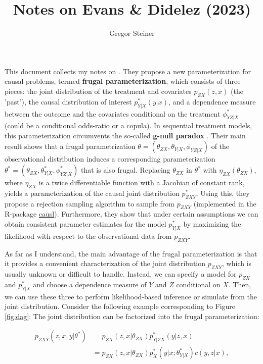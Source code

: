\documentclass[10pt]{article}
\author{Gregor Steiner}
\title{Notes on Evans \& Didelez (2023)}
\begin{document}
\maketitle

This document collects my notes on \cite{evans_didelez_2023}. They propose a new parameterization for causal problems, termed \textbf{frugal parameterization}, which consists of three pieces: the joint distribution of the treatment and covariates $p_{ZX}(z, x)$ (the 'past'), the causal distribution of interest $p_{Y | X}^* (y|x)$, and a dependence measure between the outcome and the covariates conditional on the treatment $\phi_{YZ | X}^*$ (could be a conditional odds-ratio or a copula). In sequential treatment models, this parameterization circumvents the so-called \textbf{g-null paradox} \citep{robins_wasserman_1997}. Their main result shows that a frugal parametrization $\theta = (\theta_{ZX}, \theta_{Y|X}, \phi_{YZ | X})$ of the observational distribution induces a corresponding parameterization  $\theta^* = (\theta_{ZX}, \theta_{Y|X}^*, \phi_{YZ | X}^*)$ that is also frugal. Replacing $\theta_{ZX}$ in $\theta^*$ with $\eta_{ZX}(\theta_{ZX})$, where $\eta_{ZX}$ is a twice differentiable function with a Jacobian of constant rank, yields a parameterization of the causal joint distribution $p_{ZXY}^*$. Using this, they propose a rejection sampling algorithm to sample from $p_{ZXY}$ (implemented in the R-package \href{https://github.com/rje42/causl}{causl}). Furthermore, they show that under certain assumptions we can obtain consistent parameter estimates for the model $p_{Y | X}^*$ by maximizing the likelihood with respect to the observational data from $p_{ZXY}$. 

As far as I understand, the main advantage of the frugal parameterization is that it provides a convenient characterization of the joint distribution $p_{ZXY}$, which is usually unknown or difficult to handle. Instead, we can specify a model for $p_{ZX}$ and $p_{Y | X}^*$ and choose a dependence measure of $Y$ and $Z$ conditional on $X$. Then, we can use these three to perform likelihood-based inference or simulate from the joint distribution. Consider the following example corresponding to Figure \ref{fig:dag}: The joint distribution can be factorized into the frugal parameterization:

\begin{align}
	p_{ZXY}(z, x, y | \theta^*) &= p_{ZX}(z, x | \theta_{ZX}) p_{Y|ZX}^*(y|z, x) \\
	&= p_{ZX}(z, x | \theta_{ZX}) p_X^*(y | x; \theta_{Y|X}^*) c(y, z| x),
\end{align}
\end{document}
